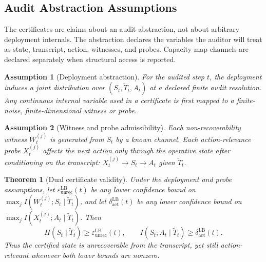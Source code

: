 \documentclass{article}
\newtheorem{theorem}{Theorem}
\newtheorem{assumption}{Assumption}
\begin{document}
  \subsection{Audit Abstraction Assumptions}

  The certificates are claims about an audit abstraction, not about arbitrary
  deployment internals. The abstraction declares the variables the auditor will
  treat as state, transcript, action, witnesses, and probes. Capacity-map
  channels are declared separately when structural access is reported.

  \begin{assumption}[Deployment abstraction]
  For the audited step $t$, the deployment induces a joint distribution over
  $(S_t,\tilde T_t,A_t)$ at a declared finite audit resolution. Any continuous
  internal variable used in a certificate is first mapped to a finite-noise,
  finite-dimensional witness or probe.
  \end{assumption}

  \begin{assumption}[Witness and probe admissibility]
  Each non-recoverability witness $W_t^{(j)}$ is generated from $S_t$ by a known
  channel. Each action-relevance probe $X_t^{(j)}$ affects the next action only
  through the operative state after conditioning on the transcript:
  $X_t^{(j)}\to S_t\to A_t$ given $\tilde T_t$.
  \end{assumption}

  \begin{theorem}[Dual certificate validity]
  Under the deployment and probe assumptions, let
  $\varepsilon_\mathrm{unrec}^\mathrm{LB}(t)$ be any lower confidence bound on
  $\max_j I(W_t^{(j)};S_t\mid\tilde T_t)$, and let
  $\delta_\mathrm{act}^\mathrm{LB}(t)$ be any lower confidence bound on
  $\max_j I(X_t^{(j)};A_t\mid\tilde T_t)$. Then
  \[
    H(S_t\mid \tilde T_t)\geq
    \varepsilon_\mathrm{unrec}^\mathrm{LB}(t),
    \qquad
    I(S_t;A_t\mid \tilde T_t)\geq
    \delta_\mathrm{act}^\mathrm{LB}(t).
  \]
  Thus the certified state is unrecoverable from the transcript, yet still
  action-relevant whenever both lower bounds are nonzero.
  \end{theorem}
\end{document}
